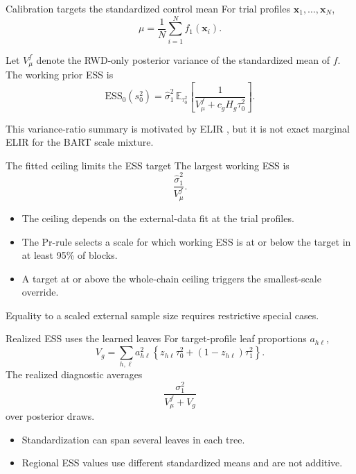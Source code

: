\documentclass[11pt,aspectratio=169]{beamer}
\newcommand{\E}{\mathbb{E}}
\newcommand{\bx}{\bm{x}}
\begin{document}
\begin{frame}{Calibration targets the standardized control mean}
  \large
  For trial profiles $\bx_1,\ldots,\bx_N$,
  \[
    \mu=\frac{1}{N}\sum_{i=1}^N f_1(\bx_i).
  \]

  Let $V_\mu^f$ denote the RWD-only posterior variance of the standardized mean of $f$. The working prior ESS is
  \[
    \mathrm{ESS}_0(s_0^2)
    =\hat\sigma_1^2\,
      \E_{\tau_0^2}\!\left[
      \frac{1}{V_\mu^f+c_gH_g\tau_0^2}\right].
  \]

  \vfill
  {\small This variance-ratio summary is motivated by ELIR \citep{neuenschwander2020}, but it is not exact marginal ELIR for the BART scale mixture.}
\end{frame}

\begin{frame}{The fitted ceiling limits the ESS target}
  \large
  The largest working ESS is
  \[
    \frac{\hat\sigma_1^2}{V_\mu^f}.
  \]

  \vspace{0.7em}
  \begin{itemize}\setlength\itemsep{0.75em}
    \item The ceiling depends on the external-data fit at the trial profiles.
    \item The Pr-rule selects a scale for which working ESS is at or below the target in at least 95\% of blocks.
    \item A target at or above the whole-chain ceiling triggers the smallest-scale override.
  \end{itemize}

  \vfill
  {\small Equality to a scaled external sample size requires restrictive special cases.}
\end{frame}

\begin{frame}{Realized ESS uses the learned leaves}
  \normalsize
  For target-profile leaf proportions $a_{h\ell}$,
  \[
    V_g=\sum_{h,\ell}a_{h\ell}^2
    \left\{z_{h\ell}\tau_0^2+(1-z_{h\ell})\tau_1^2\right\}.
  \]
  The realized diagnostic averages
  \[
    \frac{\sigma_1^2}{V_\mu^f+V_g}
  \]
  over posterior draws.

  \vspace{0.6em}
  \begin{itemize}\setlength\itemsep{0.55em}
    \item Standardization can span several leaves in each tree.
    \item Regional ESS values use different standardized means and are not additive.
  \end{itemize}
\end{frame}
\end{document}
